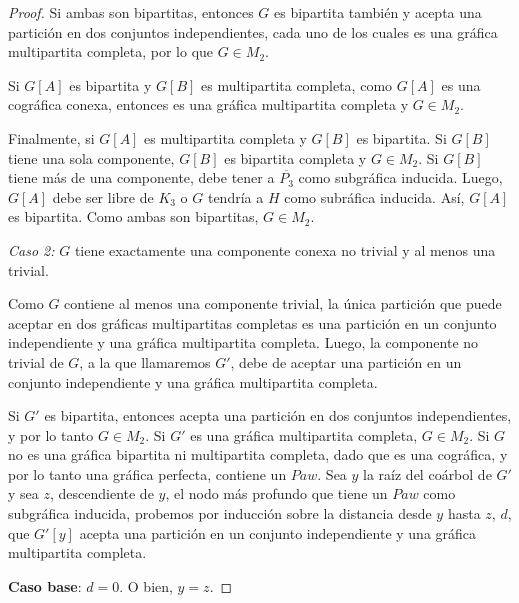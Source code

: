 \begin{proof}
    Si ambas son bipartitas, entonces $G$ es bipartita también y acepta una partición en dos conjuntos independientes, cada uno de los cuales es una gráfica multipartita completa, por lo que $G \in M_2$. 
    
    Si $G[A]$ es bipartita y $G[B]$ es multipartita completa, como $G[A]$ es una cográfica conexa, entonces es una gráfica multipartita completa y $G \in M_2$. 
    
    Finalmente, si $G[A]$ es multipartita completa y $G[B]$ es bipartita. Si $G[B]$ tiene una sola componente, $G[B]$ es bipartita completa y $G \in M_2$. Si $G[B]$ tiene más de una componente, debe tener a $\overline{P_3}$ como subgráfica inducida. Luego, $G[A]$ debe ser libre de $K_3$ o $G$ tendría a $H$ como subráfica inducida. Así, $G[A]$ es bipartita. Como ambas son bipartitas, $G \in M_2$.
    
    \emph{Caso 2:} $G$ tiene exactamente una componente conexa no trivial y al menos una trivial.
    
    Como $G$ contiene al menos una componente trivial, la única partición que puede aceptar en dos gráficas multipartitas completas es una partición en un conjunto independiente y una gráfica multipartita completa. Luego, la componente no trivial de $G$, a la que llamaremos $G'$, debe de aceptar una partición en un conjunto independiente y una gráfica multipartita completa. 
    
    Si $G'$ es bipartita, entonces acepta una partición en dos conjuntos independientes, y por lo tanto $G \in M_2$. Si $G'$ es una gráfica multipartita completa, $G \in M_2$. Si $G$ no es una gráfica bipartita ni multipartita completa, dado que es una cográfica, y por lo tanto una gráfica perfecta, contiene un $Paw$. Sea $y$ la raíz del coárbol de $G'$ y sea $z$, descendiente de $y$, el nodo más profundo que tiene un $Paw$ como subgráfica inducida, probemos por inducción sobre la distancia desde $y$ hasta $z$, $d$, que $G'[y]$ acepta una partición en un conjunto independiente y una gráfica multipartita completa. 
    
    \textbf{Caso base}: $d = 0$. O bien, $y = z$.
    

\end{proof}
